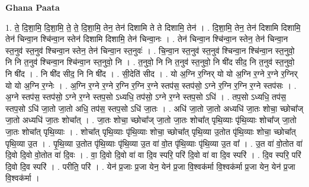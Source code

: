 \documentclass[17pt]{extarticle}
\begin{document}
\textbf{Ghana Paata } \newline

1. ते॒ दि॒शा॒मि॒ दि॒शा॒मि॒ ते॒ ते॒ दि॒शा॒मि॒ तेन॒ तेन॑ दिशामि ते ते दिशामि॒ तेन॑ । . दि॒शा॒मि॒ तेन॒ तेन॑ दिशामि दिशामि॒ तेन॑ चिन्वा॒न श्चि॑न्वा॒न स्तेन॑ दिशामि दिशामि॒ तेन॑ चिन्वा॒नः । . तेन॑ चिन्वा॒न श्चि॑न्वा॒न स्तेन॒ तेन॑ चिन्वा॒न स्त॒नुव॑ स्त॒नुव॑ श्चिन्वा॒न स्तेन॒ तेन॑ चिन्वा॒न स्त॒नुवः॑ । . चि॒न्वा॒न स्त॒नुव॑ स्त॒नुव॑ श्चिन्वा॒न श्चि॑न्वा॒न स्त॒नुवो॒ नि नि त॒नुव॑ श्चिन्वा॒न श्चि॑न्वा॒न स्त॒नुवो॒ नि । . त॒नुवो॒ नि नि त॒नुव॑ स्त॒नुवो॒ नि षी॑द सीद॒ नि त॒नुव॑ स्त॒नुवो॒ नि षी॑द । . नि षी॑द सीद॒ नि नि षी॑द । . सी॒देति॑ सीद । . यो अ॒ग्नि र॒ग्निर् यो यो अ॒ग्नि र॒ग्ने र॒ग्ने र॒ग्निर् यो यो अ॒ग्नि र॒ग्नेः । . अ॒ग्नि र॒ग्ने र॒ग्ने र॒ग्नि र॒ग्नि र॒ग्ने स्तप॑स॒ स्तप॑सो॒ ऽग्ने र॒ग्नि र॒ग्नि र॒ग्ने स्तप॑सः । . अ॒ग्ने स्तप॑स॒ स्तप॑सो॒ ऽग्ने र॒ग्ने स्तप॒सो ऽध्यधि॒ तप॑सो॒ ऽग्ने र॒ग्ने स्तप॒सो ऽधि॑ । . तप॒सो ऽध्यधि॒ तप॑स॒ स्तप॒सो ऽधि॑ जा॒तो जा॒तो अधि॒ तप॑स॒ स्तप॒सो ऽधि॑ जा॒तः । . अधि॑ जा॒तो जा॒तो अध्यधि॑ जा॒तः शोचा॒ च्छोचा᳚ज् जा॒तो अध्यधि॑ जा॒तः शोचा᳚त् । . जा॒तः शोचा॒ च्छोचा᳚ज् जा॒तो जा॒तः शोचा᳚त् पृथि॒व्याः पृ॑थि॒व्याः शोचा᳚ज् जा॒तो जा॒तः शोचा᳚त् पृथि॒व्याः । . शोचा᳚त् पृथि॒व्याः पृ॑थि॒व्याः शोचा॒ च्छोचा᳚त् पृथि॒व्या उ॒तोत पृ॑थि॒व्याः शोचा॒ च्छोचा᳚त् पृथि॒व्या उ॒त । . पृ॒थि॒व्या उ॒तोत पृ॑थि॒व्याः पृ॑थि॒व्या उ॒त वा॑ वो॒त पृ॑थि॒व्याः पृ॑थि॒व्या उ॒त वा᳚ । . उ॒त वा॑ वो॒तोत वा॑ दि॒वो दि॒वो वो॒तोत वा॑ दि॒वः । . वा॒ दि॒वो दि॒वो वा॑ वा दि॒व स्परि॒ परि॑ दि॒वो वा॑ वा दि॒व स्परि॑ । . दि॒व स्परि॒ परि॑ दि॒वो दि॒व स्परि॑ । . परीति॒ परि॑ । . येन॑ प्र॒जाः प्र॒जा येन॒ येन॑ प्र॒जा वि॒श्वक॑र्मा वि॒श्वक॑र्मा प्र॒जा येन॒ येन॑ प्र॒जा वि॒श्वक॑र्मा । \newline
\end{document}

